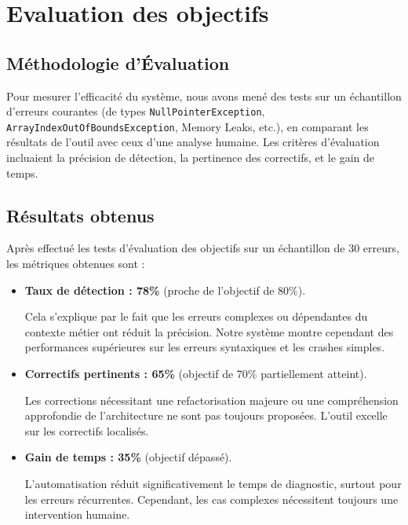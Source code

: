 \documentclass[12pt,a4paper]{report}
\begin{document}
	\section*{Evaluation des objectifs}
	
	\subsection*{Méthodologie d'Évaluation}
	
	Pour mesurer l’efficacité du système, nous avons mené des tests sur un échantillon d'erreurs courantes (de types \verb|NullPointerException|, \verb|ArrayIndexOutOfBoundsException|, Memory Leaks, etc.), en comparant les résultats de l’outil avec ceux d’une analyse humaine. Les critères d’évaluation incluaient la précision de détection, la pertinence des correctifs, et le gain de temps.
	
	\subsection*{Résultats obtenus}
	
	Après effectué les tests d'évaluation des objectifs sur un échantillon de 30 erreurs, les métriques obtenues sont :
	
	\begin{itemize}
		
		\item \textbf{Taux de détection : 78\%} (proche de l’objectif de 80\%).
		
		Cela s'explique par le fait que les erreurs complexes ou dépendantes du contexte métier ont réduit la précision. Notre système montre cependant des performances supérieures sur les erreurs syntaxiques et les crashes simples.
		
		\item \textbf{Correctifs pertinents : 65\%} (objectif de 70\% partiellement atteint).
		
		Les corrections nécessitant une refactorisation majeure ou une compréhension approfondie de l’architecture ne sont pas toujours proposées. L’outil excelle sur les correctifs localisés.
		
		\item \textbf{Gain de temps : 35\%} (objectif dépassé).
		
		L’automatisation réduit significativement le temps de diagnostic, surtout pour les erreurs récurrentes. Cependant, les cas complexes nécessitent toujours une intervention humaine.
		
	\end{itemize}
	
\end{document}
